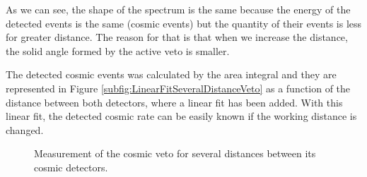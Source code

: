 
As we can see, the shape of the spectrum is the same because the energy of the detected events is the same (cosmic events) but the quantity of their events is less for greater distance. The reason for that is that when we increase the distance, the solid angle formed by the active veto is smaller.

The detected cosmic events was calculated by the area integral and they are represented in Figure \ref{subfig:LinearFitSeveralDistanceVeto} as a function of the distance between both detectors, where a linear fit has been added. With this linear fit, the detected cosmic rate can be easily known if the working distance is changed. 



\begin{figure}[htbp]
 \centering
    \newline
 \caption{Measurement of the cosmic veto for several distances between its cosmic detectors.}
 \label{fig:DistanceVeto}
\end{figure}



